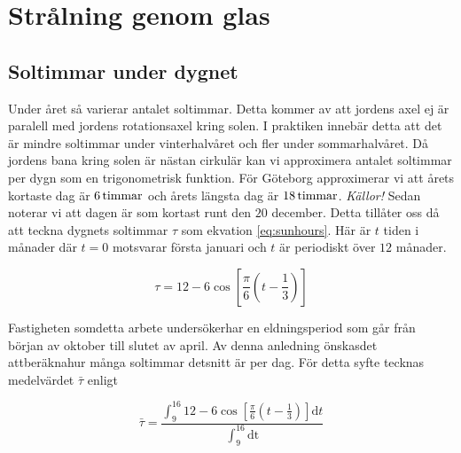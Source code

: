 \section{Strålning genom glas}\label{sec:sunthroughwindowsmethod}


\subsection{Soltimmar under dygnet}

Under året så varierar antalet soltimmar. Detta kommer av att jordens axel ej är paralell
med jordens rotationsaxel kring solen. I praktiken innebär detta att det är mindre soltimmar
under vinterhalvåret och fler under sommarhalvåret. Då jordens bana kring solen är nästan
cirkulär kan vi approximera antalet soltimmar per dygn som en trigonometrisk funktion.
För Göteborg approximerar vi att årets kortaste dag är $\unit[6]{ timmar}$ och årets längsta
dag är $\unit[18]{ timmar}$. \emph{\color{red} Källor!} Sedan noterar vi att dagen är som kortast runt den $20$
december.
Detta tillåter oss då att teckna dygnets soltimmar $\tau$ som ekvation \eqref{eq:sunhours}. Här
är $t$ tiden i månader där $t=0$ motsvarar första januari och $t$ är periodiskt över $12$ månader.

\begin{equation}
\label{eq:sunhours}
\tau = 12 - 6\cos\left[\frac{\pi}{6}\left(t-\frac{1}{3}\right)\right]
\end{equation}

\noindent
Fastigheten somdetta arbete undersökerhar en eldningsperiod som går från början av oktober
till slutet av april. Av denna anledning önskasdet attberäknahur många soltimmar detsnitt är per
dag. För detta syfte tecknas medelvärdet $\bar{\tau}$ enligt

\begin{equation}
\label{eq:taubar}
\bar{\tau}= \frac{ \int^{16}_9 12 - 6\cos\left[\frac{\pi}{6}\left(t-
\frac{1}{3}\right)\right]\mathrm{d}t}{\int^{16}_9 \mathrm{dt}}
\end{equation}

